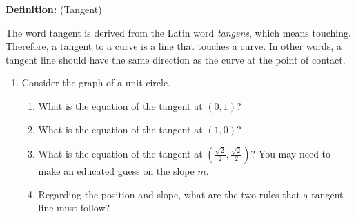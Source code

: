 \documentclass[letterpaper,11pt]{article}
\newif\ifsolutions
\begin{document}

\noindent \textbf{Definition:} (Tangent)

\noindent The word tangent is derived from the Latin word \textit{tangens}, which means touching. Therefore, a tangent to a curve is a line that touches a curve. In other words, a tangent line should have the same direction as the curve at the point of contact.

\begin{enumerate}
\item Consider the graph of a unit circle.
\begin{center}
\end{center}
\begin{enumerate}[label = \alph*.]
    \item What is the equation of the tangent at $(0,1)$? \\
    \ifsolutions \textcolor{blue} { $y=1$ } \fi
    \vspace{1.5in}
    \item What is the equation of the tangent at $(1,0)$? \\
    \ifsolutions \textcolor{blue} { $x=1$ } \fi
    \vspace{1.5in}
    \newpage
    \item What is the equation of the tangent at $(\frac{\sqrt{2}}{2}, \frac{\sqrt{2}}{2})$? You may need to make an educated guess on the slope $m$.\\
    \ifsolutions \textcolor{blue} { $y=-1(x-\frac{\sqrt{2}}{2}) + \frac{\sqrt{2}}{2} = \sqrt{2} - x$ } \fi
    \vspace{1.5in}
    \item Regarding the position and slope, what are the two rules that a tangent line must follow?\\
    \ifsolutions \textcolor{blue} { The line must touch the point and the slope must match the curve. } \fi

\end{enumerate}
\end{enumerate}
\end{document}

